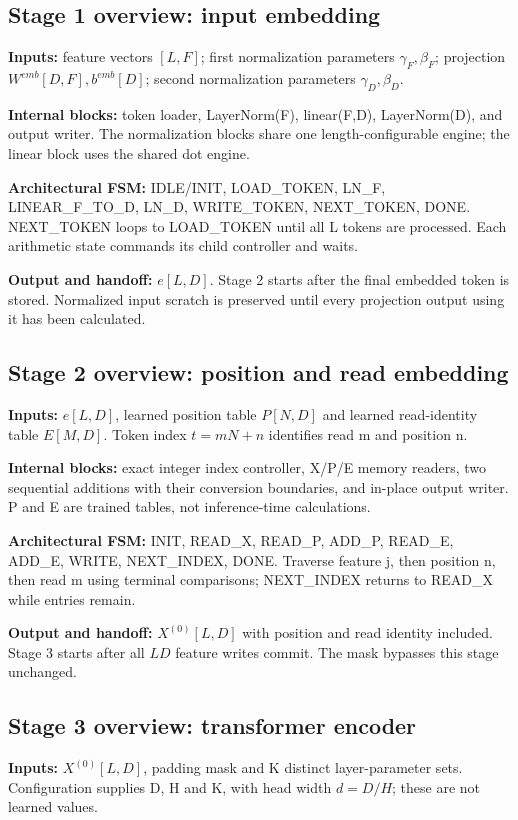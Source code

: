 \documentclass[11pt,a4paper]{article}
\begin{document}
\subsection{Stage 1 overview: input embedding}
\textbf{Inputs:} feature vectors $[L,F]$; first normalization parameters $\gamma_F,\beta_F$; projection $W^{emb}[D,F],b^{emb}[D]$; second normalization parameters $\gamma_D,\beta_D$.

\textbf{Internal blocks:} token loader, LayerNorm(F), linear(F,D), LayerNorm(D), and output writer. The normalization blocks share one length-configurable engine; the linear block uses the shared dot engine.

\textbf{Architectural FSM:} IDLE/INIT, LOAD\_TOKEN, LN\_F, LINEAR\_F\_TO\_D, LN\_D, WRITE\_TOKEN, NEXT\_TOKEN, DONE. NEXT\_TOKEN loops to LOAD\_TOKEN until all L tokens are processed. Each arithmetic state commands its child controller and waits.

\textbf{Output and handoff:} $e[L,D]$. Stage 2 starts after the final embedded token is stored. Normalized input scratch is preserved until every projection output using it has been calculated.

\subsection{Stage 2 overview: position and read embedding}
\textbf{Inputs:} $e[L,D]$, learned position table $P[N,D]$ and learned read-identity table $E[M,D]$. Token index $t=mN+n$ identifies read m and position n.

\textbf{Internal blocks:} exact integer index controller, X/P/E memory readers, two sequential additions with their conversion boundaries, and in-place output writer. P and E are trained tables, not inference-time calculations.

\textbf{Architectural FSM:} INIT, READ\_X, READ\_P, ADD\_P, READ\_E, ADD\_E, WRITE, NEXT\_INDEX, DONE. Traverse feature j, then position n, then read m using terminal comparisons; NEXT\_INDEX returns to READ\_X while entries remain.

\textbf{Output and handoff:} $X^{(0)}[L,D]$ with position and read identity included. Stage 3 starts after all $LD$ feature writes commit. The mask bypasses this stage unchanged.

\subsection{Stage 3 overview: transformer encoder}
\textbf{Inputs:} $X^{(0)}[L,D]$, padding mask and K distinct layer-parameter sets. Configuration supplies D, H and K, with head width $d=D/H$; these are not learned values.
\end{document}
